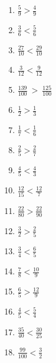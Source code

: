 \documentclass[10 pt,usenames,dvipsnames, oneside]{article}
\begin{document}
\ifdefined\prof
\begin{solucao}

\begin{multicols}{3}
\begin{enumerate}
\item $\frac{5}{9} > \frac{4}{9}$
\item $\frac{3}{6} < \frac{5}{6}$
\item   $\frac{27}{10} < \frac{29}{10}$
\item  $\frac{3}{12} < \frac{9}{12}$
\item $\frac{139}{100}~>~\frac{125}{100}$
\columnbreak

\item   $\frac{1}{2} > \frac{1}{3}$
\item  $\frac{1}{7} < \frac{1}{6}$
\item   $\frac{2}{5} > \frac{2}{7}$
\item   $\frac{4}{5} < \frac{4}{3}$
\item   $\frac{12}{15} < \frac{12}{7}$
\item   $\frac{22}{80} > \frac{22}{90}$
\columnbreak

\item   $\frac{3}{2} > \frac{2}{5}$
\item   $\frac{3}{4} < \frac{6}{5}$
\item   $\frac{7}{8} < \frac{10}{9}$
\item   $\frac{6}{5} > \frac{12}{9}$
\item  $\frac{4}{5}< \frac{5}{4}$
\item  $\frac{35}{40}< \frac{30}{25}$
\item  $\frac{99}{100}<\frac{3}{2}$
\end{enumerate}
\end{multicols}

\end{solucao}
\fi
\end{document}
